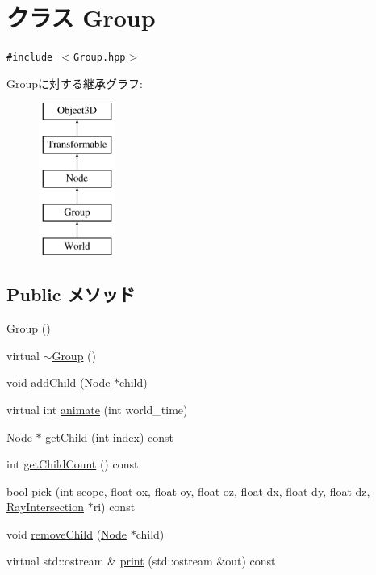 \hypertarget{classm3g_1_1Group}{
\section{クラス Group}
\label{classm3g_1_1Group}
}
{\tt \#include $<$Group.hpp$>$}

Groupに対する継承グラフ:\begin{figure}[H]
\begin{center}
\leavevmode
\includegraphics[height=5cm]{classm3g_1_1Group}
\end{center}
\end{figure}
\subsection*{Public メソッド}
\begin{CompactItemize}
\item 
\hyperlink{classm3g_1_1Group_0b29b9393b4b6856ac75b759f4166c13}{Group} ()
\item 
virtual \hyperlink{classm3g_1_1Group_a2a755272411c0d861f46f30970f5ca5}{$\sim$Group} ()
\item 
void \hyperlink{classm3g_1_1Group_f7c798f6f7924dc14403df261f82153a}{addChild} (\hyperlink{classm3g_1_1Node}{Node} $\ast$child)
\item 
virtual int \hyperlink{classm3g_1_1Group_8aad1ceab4c2a03609c8a42324ce484d}{animate} (int world\_\-time)
\item 
\hyperlink{classm3g_1_1Node}{Node} $\ast$ \hyperlink{classm3g_1_1Group_a3af7d07fde341ef751157d274538698}{getChild} (int index) const 
\item 
int \hyperlink{classm3g_1_1Group_756d01dca16e146d69bb1881aca8fbb7}{getChildCount} () const 
\item 
bool \hyperlink{classm3g_1_1Group_10a3c77fa36fdb5d09b2bf39fe2a7c0b}{pick} (int scope, float ox, float oy, float oz, float dx, float dy, float dz, \hyperlink{classm3g_1_1RayIntersection}{RayIntersection} $\ast$ri) const 
\item 
void \hyperlink{classm3g_1_1Group_7415646c6f397f080d198176df44395c}{removeChild} (\hyperlink{classm3g_1_1Node}{Node} $\ast$child)
\item 
virtual std::ostream \& \hyperlink{classm3g_1_1Group_6fea17fa1532df3794f8cb39cb4f911f}{print} (std::ostream \&out) const 
\end{CompactItemize}
